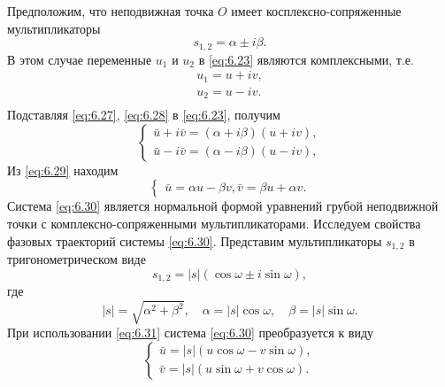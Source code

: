 Предположим, что неподвижная точка $O$ имеет косплексно-сопряженные мультипликаторы
\begin{equation}
        \label{eq:6.27}
        s_{1,2} = \alpha \pm i \beta.
\end{equation}
В этом случае переменные $u_1$ и $u_2$ в \eqref{eq:6.23} являются комплексными, т.е.
\begin{gather}
        u_1 = u + iv, \\
        u_2 = u - iv. \\
\end{gather}
Подставляя \eqref{eq:6.27}, \eqref{eq:6.28} в \eqref{eq:6.23}, получим
\begin{equation}
        \label{eq:6.29}
        \begin{cases}
                \bar u + i \bar v = (\alpha + i\beta)(u+ i v),\\
                \bar u - i \bar v = (\alpha - i \beta)(u-iv),
        \end{cases}
\end{equation}
Из \eqref{eq:6.29} находим
\begin{equation}
        \label{eq:6.30}
        \begin{cases}
                \bar u = \alpha u - \beta v,
                \bar v = \beta u + \alpha v.
        \end{cases}
\end{equation}
Система \eqref{eq:6.30} является нормальной формой уравнений грубой неподвижной точки
с комплексно-сопряженными мультипликаторами. Исследуем свойства фазовых траекторий системы 
\eqref{eq:6.30}. Представим мультипликаторы $s_{1,2}$ в тригонометрическом виде
\begin{equation}
        \label{eq:}
        s_{1,2} = |s|( \cos \omega \pm i \sin \omega),
\end{equation}
где
\begin{equation}
        \label{eq:6.31}
        |s| = \sqrt{\alpha^2 + \beta^2}, \quad \alpha = |s| \cos \omega, \quad \beta=|s|\sin \omega.
\end{equation}
При использовании \eqref{eq:6.31} система \eqref{eq:6.30} преобразуется к виду
\begin{equation}
        \label{eq:6.32}
        \begin{cases}
                \bar u = |s| (u\cos \omega - v \sin \omega),\\
                \bar v = |s|(u\sin \omega + v \cos \omega). 
        \end{cases}
\end{equation}
